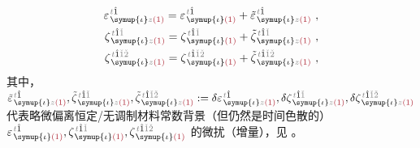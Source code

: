\begin{subequations} \label{eq:weak_modulated_linear_sus}
\begin{align}
	\varepsilon^{\;\! \mathcolor{gray}{t} \hat{1}}_{\;\! \symup{\iota} \mathcolor{gray}{z} \textcolor{Maroon}{(1)}} = \varepsilon^{\;\! \mathcolor{gray}{t} \hat{1}}_{\;\! \symup{\iota} \textcolor{Maroon}{(1)}} + \tilde{\varepsilon}^{\;\! \mathcolor{gray}{t} \hat{1}}_{\;\! \symup{\iota} \mathcolor{gray}{z} \textcolor{Maroon}{(1)}}~, \label{eq:weak_modulated_varepsilon} \\
	\zeta^{\;\! \mathcolor{gray}{t} \hat{1} \mathcolor{gray}{\check{1}}}_{\;\! \symup{\iota} \mathcolor{gray}{z} \textcolor{Maroon}{(1)}} = \zeta^{\;\! \mathcolor{gray}{t} \hat{1} \mathcolor{gray}{\check{1}}}_{\;\! \symup{\iota} \textcolor{Maroon}{(1)}} + \tilde{\zeta}^{\;\! \mathcolor{gray}{t} \hat{1} \mathcolor{gray}{\check{1}}}_{\;\! \symup{\iota} \mathcolor{gray}{z} \textcolor{Maroon}{(1)}}~, \\
	\zeta^{\;\! \mathcolor{gray}{t} \hat{1} \mathcolor{gray}{\check{1} \check{2}}}_{\;\! \symup{\iota} \mathcolor{gray}{z} \textcolor{Maroon}{(1)}} = \zeta^{\;\! \mathcolor{gray}{t} \hat{1} \mathcolor{gray}{\check{1} \check{2}}}_{\;\! \symup{\iota} \textcolor{Maroon}{(1)}} + \tilde{\zeta}^{\;\! \mathcolor{gray}{t} \hat{1} \mathcolor{gray}{\check{1} \check{2}}}_{\;\! \symup{\iota} \mathcolor{gray}{z} \textcolor{Maroon}{(1)}}~,
\end{align}
\end{subequations}
其中，$\tilde{\varepsilon}^{\;\! \mathcolor{gray}{t} \hat{1}}_{\;\! \symup{\iota} \mathcolor{gray}{z} \textcolor{Maroon}{(1)}}, \tilde{\zeta}^{\;\! \mathcolor{gray}{t} \hat{1} \mathcolor{gray}{\check{1}}}_{\;\! \symup{\iota} \mathcolor{gray}{z} \textcolor{Maroon}{(1)}}, \tilde{\zeta}^{\;\! \mathcolor{gray}{t} \hat{1} \mathcolor{gray}{\check{1} \check{2}}}_{\;\! \symup{\iota} \mathcolor{gray}{z} \textcolor{Maroon}{(1)}} := \delta \varepsilon^{\;\! \mathcolor{gray}{t} \hat{1}}_{\;\! \symup{\iota} \mathcolor{gray}{z} \textcolor{Maroon}{(1)}}, \delta \zeta^{\;\! \mathcolor{gray}{t} \hat{1} \mathcolor{gray}{\check{1}}}_{\;\! \symup{\iota} \mathcolor{gray}{z} \textcolor{Maroon}{(1)}}, \delta \zeta^{\;\! \mathcolor{gray}{t} \hat{1} \mathcolor{gray}{\check{1} \check{2}}}_{\;\! \symup{\iota} \mathcolor{gray}{z} \textcolor{Maroon}{(1)}}$ 代表略微偏离\textcolor{NavyBlue}{恒定/无调制}材料常数背景（但仍然是时间\textcolor{NavyBlue}{色散}的）$\varepsilon^{\;\! \mathcolor{gray}{t} \hat{1}}_{\;\! \symup{\iota} \textcolor{Maroon}{(1)}}, \zeta^{\;\! \mathcolor{gray}{t} \hat{1} \mathcolor{gray}{\check{1}}}_{\;\! \symup{\iota} \textcolor{Maroon}{(1)}}, \zeta^{\;\! \mathcolor{gray}{t} \hat{1} \mathcolor{gray}{\check{1} \check{2}}}_{\;\! \symup{\iota} \textcolor{Maroon}{(1)}}$ 的\textcolor{NavyBlue}{微扰}（增量），见 。

